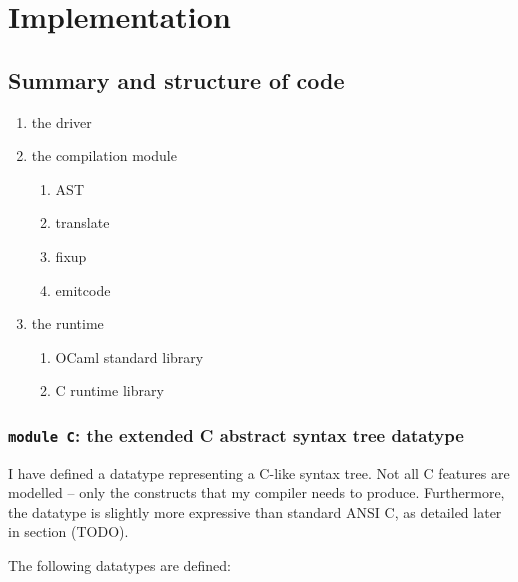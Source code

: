 \documentclass[12pt,a4paper,twoside,openright]{report}
\begin{document}


\chapter{Implementation}

\section{Summary and structure of code}

\begin{enumerate}
  \item the driver
  \item the compilation module
    \begin{enumerate}
      \item AST
      \item translate
      \item fixup
      \item emitcode
    \end{enumerate}
  \item the runtime
    \begin{enumerate}
      \item OCaml standard library
      \item C runtime library
    \end{enumerate}
\end{enumerate}

\subsection{\lstinline!module C!: the extended C abstract syntax tree datatype}

I have defined a datatype representing a C-like syntax tree. Not all C features are modelled -- only the constructs that my compiler needs to produce. Furthermore, the datatype is slightly more expressive than standard ANSI C, as detailed later in section (TODO).

The following datatypes are defined:
\end{document}

